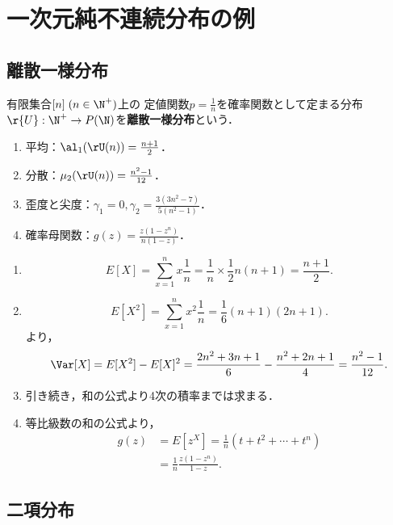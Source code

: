 \documentclass[uplatex,dvipdfmx]{jsreport}
\begin{document}
\section{一次元純不連続分布の例}

\subsection{離散一様分布}

\begin{definition}
    有限集合$[n]\;(n\in\N^+)$上の
    定値関数$p=\frac{1}{n}$を確率関数として定まる分布$\r{U}:\N^+\to P(\N)$を\textbf{離散一様分布}という．
\end{definition}

\begin{proposition}[離散一様分布の特性値]\mbox{}
    \begin{enumerate}
        \item 平均：$\al_1(\rU(n))=\frac{n+1}{2}$．
        \item 分散：$\mu_2(\rU(n))=\frac{n^2-1}{12}$．
        \item 歪度と尖度：$\gamma_1=0,\gamma_2=\frac{3(3n^2-7)}{5(n^2-1)}$．
        \item 確率母関数：$g(z)=\frac{z(1-z^n)}{n(1-z)}$．
    \end{enumerate}
\end{proposition}
\begin{Proof}\mbox{}
    \begin{enumerate}
        \item \[E[X]=\sum_{x=1}^nx\frac{1}{n}=\frac{1}{n}\times\frac{1}{2}n(n+1)=\frac{n+1}{2}.\]
        \item \[E[X^2]=\sum_{x=1}^nx^2\frac{1}{n}=\frac{1}{6}(n+1)(2n+1).\]
        より，
        \[\Var[X]=E[X^2]-E[X]^2=\frac{2n^2+3n+1}{6}-\frac{n^2+2n+1}{4}=\frac{n^2-1}{12}.\]
        \item 引き続き，和の公式より4次の積率までは求まる．
        \item 等比級数の和の公式より，
        \begin{align*}
            g(z)&=E[z^X]=\frac{1}{n}(t+t^2+\cdots+t^n)\\
            &=\frac{1}{n}\frac{z(1-z^n)}{1-z}.
        \end{align*}
    \end{enumerate}
\end{Proof}

\subsection{二項分布}
\end{document}
